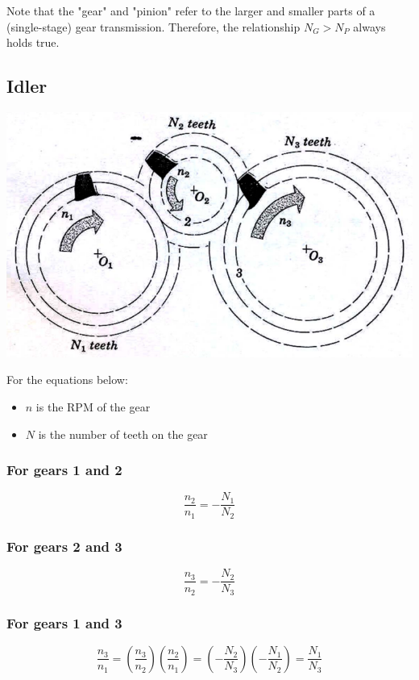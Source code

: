 \documentclass[11pt]{article}
\begin{document}
Note that the "gear" and "pinion" refer to the larger and smaller parts of a (single-stage) gear transmission. Therefore, the relationship \(N_G > N_P\) always holds true.
\subsection{Idler}
\label{sec:orgaa4d2bc}
\begin{center}
\includegraphics[width=.9\linewidth]{./images/idler-image.png}
\end{center}

For the equations below:
\begin{itemize}
\item \(n\) is the RPM of the gear
\item \(N\) is the number of teeth on the gear
\end{itemize}
\subsubsection{For gears 1 and 2}
\label{sec:orgb90f6ed}
\[\frac{n_2}{n_1} = - \frac{N_1}{N_2}\]
\subsubsection{For gears 2 and 3}
\label{sec:orgbe14874}
\[\frac{n_3}{n_2} = - \frac{N_2}{N_3}\]
\subsubsection{For gears 1 and 3}
\label{sec:orgc00c59f}
\[\frac{n_3}{n_1} = \left(\frac{n_3}{n_2}\right) \left(\frac{n_2}{n_1}\right) = \left(-\frac{N_2}{N_3} \right) \left(-\frac{N_1}{N_2} \right) = \frac{N_1}{N_3}\]
\end{document}
